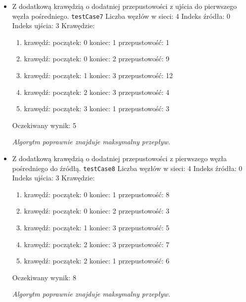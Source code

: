 \begin{itemize}[nosep]
    \item Z dodatkową krawędzią o dodatniej przepustowości z ujścia do
    pierwszego węzła pośredniego.
    \texttt{testCase7}
    Liczba węzłów w sieci: 4
    Indeks źródła: 0
    Indeks ujścia: 3
    Krawędzie:
    \begin{enumerate}[nosep]
        \item krawędź:
        początek: 0
        koniec: 1
        przepustowość: 1
        \item krawędź:
        początek: 0
        koniec: 2
        przepustowość: 9
        \item krawędź:
        początek: 1
        koniec: 3
        przepustowość: 12
        \item krawędź:
        początek: 2
        koniec: 3
        przepustowość: 4
        \item krawędź:
        początek: 3
        koniec: 1
        przepustowość: 3
    \end{enumerate}
    Oczekiwany wynik: 5

    \emph{Algorytm poprawnie znajduje maksymalny przepływ.}

    \item Z dodatkową krawędzią o dodatniej przepustowości z pierwszego węzła
    pośredniego do źródłą.
    \texttt{testCase8}
    Liczba węzłów w sieci: 4
    Indeks źródła: 0
    Indeks ujścia: 3
    Krawędzie:
    \begin{enumerate}[nosep]
        \item krawędź:
        początek: 0
        koniec: 1
        przepustowość: 8
        \item krawędź:
        początek: 0
        koniec: 2
        przepustowość: 3
        \item krawędź:
        początek: 1
        koniec: 3
        przepustowość: 5
        \item krawędź:
        początek: 2
        koniec: 3
        przepustowość: 7
        \item krawędź:
        początek: 2
        koniec: 1
        przepustowość: 6
    \end{enumerate}
    Oczekiwany wynik: 8

    \emph{Algorytm
    poprawnie znajduje maksymalny przepływ.}


\end{itemize}
